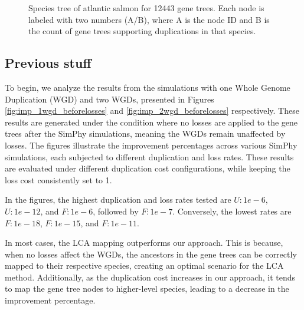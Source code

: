 \documentclass[10pt]{article}
\begin{document}
\begin{figure}[h!]
    \caption{
        Species tree of atlantic salmon for 12443 gene trees. Each node is labeled with two numbers (A/B), where A is the node ID and B is the count of gene trees supporting duplications in that species.
    }
    \label{fig:salmon}
\end{figure}


\clearpage
\subsection*{Previous stuff}

To begin, we analyze the results from the simulations with one Whole Genome Duplication (WGD) and two WGDs, presented in Figures \ref{fig:imp_1wgd_beforelosses} and \ref{fig:imp_2wgd_beforelosses} respectively. These results are generated under the condition where no losses are applied to the gene trees after the SimPhy simulations, meaning the WGDs remain unaffected by losses. The figures illustrate the improvement percentages across various SimPhy simulations, each subjected to different duplication and loss rates. These results are evaluated under different duplication cost configurations, while keeping the loss cost consistently set to 1.

In the figures, the highest duplication and loss rates tested are $U:1e-6$, $U:1e-12$, and $F:1e-6$, followed by $F:1e-7$. Conversely, the lowest rates are $F:1e-18$, $F:1e-15$, and $F:1e-11$.

In most cases, the LCA mapping outperforms our approach. This is because, when no losses affect the WGDs, the ancestors in the gene trees can be correctly mapped to their respective species, creating an optimal scenario for the LCA method. Additionally, as the duplication cost increases in our approach, it tends to map the gene tree nodes to higher-level species, leading to a decrease in the improvement percentage.
\end{document}
